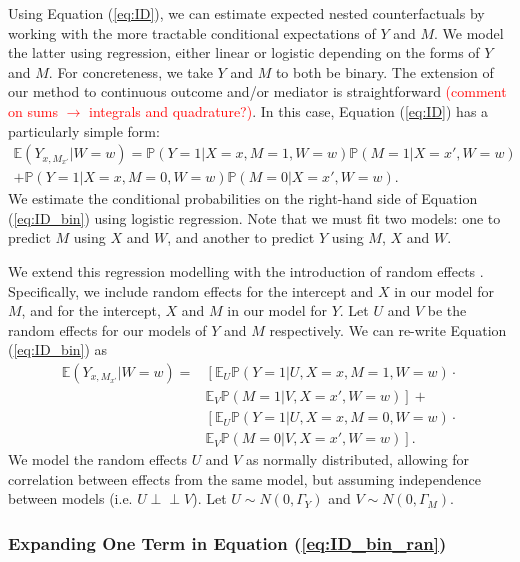 \documentclass{article}
\newcommand{\bP}{\mathbb{P}}
\newcommand{\bE}{\mathbb{E}}
\newcommand{\indep}{\perp \!\!\! \perp}
\begin{document}
Using Equation (\ref{eq:ID}), we can estimate expected nested counterfactuals by working with the more tractable conditional expectations of $Y$ and $M$. We model the latter using regression, either linear or logistic depending on the forms of $Y$ and $M$. For concreteness, we take $Y$ and $M$ to both be binary. The extension of our method to continuous outcome and/or mediator is straightforward \textcolor{red}{(comment on sums $\rightarrow$ integrals and quadrature?)}. In this case, Equation (\ref{eq:ID}) has a particularly simple form:
%
\begin{multline}
    \bE (Y_{x, M_{x'}} | W=w) = \bP \left( Y=1 | X=x, M=1, W=w \right) \bP(M=1 | X = x', W=w) \\ + \bP \left( Y=1 | X=x, M=0, W=w \right) \bP(M=0 | X = x', W=w). \label{eq:ID_bin}
\end{multline}
%
We estimate the conditional probabilities on the right-hand side of Equation (\ref{eq:ID_bin}) using logistic regression. Note that we must fit two models: one to predict $M$ using $X$ and $W$, and another to predict $Y$ using $M$, $X$ and $W$.

We extend this regression modelling with the introduction of random effects \citep[see, e.g.][]{Dem04}. Specifically, we include random effects for the intercept and $X$ in our model for $M$, and for the intercept, $X$ and $M$ in our model for $Y$. Let $U$ and $V$ be the random effects for our models of $Y$ and $M$ respectively. We can re-write Equation (\ref{eq:ID_bin}) as
%
\begin{align}
    \bE (Y_{x, M_{x'}} | W=w) = & \left[\bE_U \bP \left( Y=1 |U, X=x, M=1, W=w \right) \right. \cdot \label{eq:ID_bin_ran}\\
    &  \left. \bE_V \bP(M=1 |V, X = x', W=w)\right] + \nonumber \\ 
    & \left[ \bE_U \bP \left( Y=1 |U, X=x, M=0, W=w \right) \right. \cdot \nonumber \\
    & \left. \bE_V \bP(M=0 |V, X = x', W=w) \right]. \nonumber 
\end{align}
%
We model the random effects $U$ and $V$ as normally distributed, allowing for correlation between effects from the same model, but assuming independence between models (i.e. $U \indep V$). Let $U \sim N(0, \Gamma_Y)$ and $V \sim N(0, \Gamma_M)$.


\subsubsection{Expanding One Term in Equation (\ref{eq:ID_bin_ran})}
\end{document}
